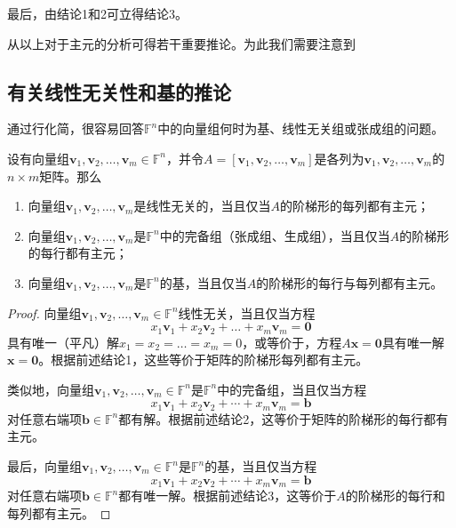 最后，由结论1和2可立得结论3。{\hfill\qedsymbol}

从以上对于主元的分析可得若干重要推论。为此我们需要注意到
\begin{center}
\end{center}

\subsection{有关线性无关性和基的推论}

通过行化简，很容易回答$\mathbb{F}^n$中的向量组何时为基、线性无关组或张成组的问题。

\begin{proposition}\label{prop:li_span_eq}
  设有向量组$\mathbf{v}_{1},\mathbf{v}_{2},\ldots,\mathbf{v}_{m}\in\mathbb{F}^{n}$，并令$A=[\mathbf{v}_{1},\mathbf{v}_{2},\ldots,\mathbf{v}_{m}]$是各列为$\mathbf{v}_{1},\mathbf{v}_{2},\ldots,\mathbf{v}_{m}$的$n\times m$矩阵。那么
  \begin{enumerate}
    \item 向量组$\mathbf{v}_{1},\mathbf{v}_{2},\ldots,\mathbf{v}_{m}$是线性无关的，当且仅当$A$的阶梯形的每列都有主元；
    \item 向量组$\mathbf{v}_{1},\mathbf{v}_{2},\ldots,\mathbf{v}_{m}$是$\mathbb{F}^{n}$中的完备组（张成组、生成组），当且仅当$A$的阶梯形的每行都有主元；
    \item 向量组$\mathbf{v}_{1},\mathbf{v}_{2},\ldots,\mathbf{v}_{m}$是$\mathbb{F}^{n}$的基，当且仅当$A$的阶梯形的每行与每列都有主元。
  \end{enumerate}
\end{proposition}
\begin{proof}
  向量组$\mathbf{v}_{1},\mathbf{v}_{2},\ldots,\mathbf{v}_{m}\in\mathbb{F}^{n}$线性无关，当且仅当方程\[x_1\mathbf{v}_1+x_2\mathbf{v}_2+\ldots+x_m\mathbf{v}_m=\mathbf{0}\]具有唯一（平凡）解$x_{1}=x_{2}=\ldots=x_{m}=0$，或等价于，方程$A\mathbf{x}=\mathbf{0}$具有唯一解$\mathbf{x}=\mathbf{0}$。根据前述结论1，这些等价于矩阵的阶梯形每列都有主元。

  类似地，向量组$\mathbf{v}_{1},\mathbf{v}_{2},\ldots,\mathbf{v}_{m}\in\mathbb{F}^{n}$是$\mathbb{F}^{n}$中的完备组，当且仅当方程\[x_1\mathbf{v}_1+x_2\mathbf{v}_2+\cdots+x_m\mathbf{v}_m=\mathbf{b}\]对任意右端项$\mathbf{b}\in\mathbb{F}^n$都有解。根据前述结论2，这等价于矩阵的阶梯形的每行都有主元。

  最后，向量组$\mathbf{v}_{1},\mathbf{v}_{2},\ldots,\mathbf{v}_{m}\in\mathbb{F}^{n}$是$\mathbb{F}^{n}$的基，当且仅当方程\[x_1\mathbf{v}_1+x_2\mathbf{v}_2+\cdots+x_m\mathbf{v}_m=\mathbf{b}\]对任意右端项$\mathbf{b}\in\mathbb{F}^n$都有唯一解。根据前述结论3，这等价于$A$的阶梯形的每行和每列都有主元。
\end{proof}

